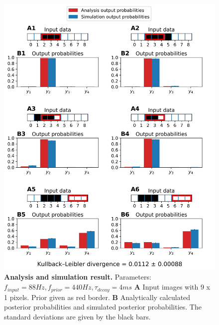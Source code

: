 \begin{figure}
  \includegraphics[width=\linewidth]{figures/1D/1D_88_440_4.png}
       \caption{\textbf{Analysis and simulation result. } Parameters: $f_{input} = 88 Hz, f_{prior} = 440 Hz, \tau_{decay} = 4 ms$ \textbf{A} Input images with 9 x 1 pixels. Prior given as red border. \textbf{B} Analytically calculated posterior probabilities and simulated posterior probabilities. The standard deviations are given by the black bars.}
  \label{fig:1D_88_440_4}
\end{figure}

